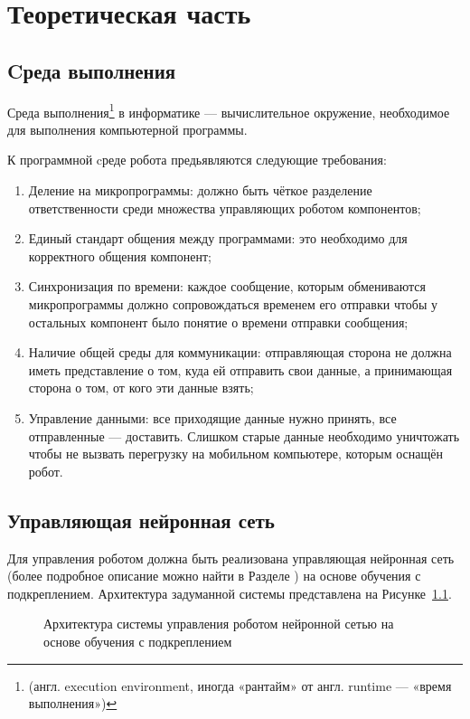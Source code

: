 \chapter{Теоретическая часть}\label{ch:ch1}

\section{Cреда выполнения}\label{sec:ch1/sec1}
Среда выполнения\footnote{(англ. execution environment, иногда «рантайм» от англ. runtime — «время выполнения»)} в информатике — вычислительное окружение, необходимое для выполнения компьютерной программы\cite{runtime}. 

К программной cреде робота предьявляются следующие требования:
\begin{enumerate}[beginpenalty=10000] %
  \item Деление на микропрограммы: должно быть чёткое разделение ответственности среди множества управляющих роботом компонентов;
  \item Единый стандарт общения между программами: это необходимо для корректного общения компонент;
  \item Синхронизация по времени: каждое сообщение, которым обмениваются микропрограммы должно сопровождаться временем его отправки чтобы у остальных компонент было понятие о времени отправки сообщения;
  \item Наличие общей среды для коммуникации: отправляющая сторона не должна иметь представление о том, куда ей отправить свои данные, а принимающая сторона о том, от кого эти данные взять;
  \item Управление данными: все приходящие данные нужно принять, все отправленные --- доставить. Слишком старые данные необходимо уничтожать чтобы не вызвать перегрузку на мобильном компьютере, которым оснащён робот.
\end{enumerate}

\section{Управляющая нейронная сеть}
Для управления роботом должна быть реализована управляющая нейронная сеть (более подробное описание можно найти в Разделе ) на основе обучения с подкреплением. Архитектура задуманной системы представлена на Рисунке~\cref{fig:architecture}.

\begin{figure}[ht]
    \caption{Архитектура системы управления роботом нейронной сетью на основе обучения с подкреплением}\label{fig:architecture}
\end{figure}

